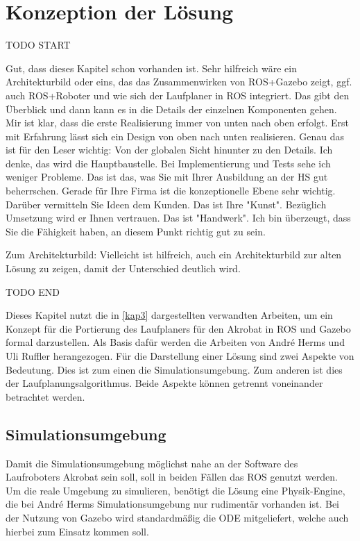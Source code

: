 \chapter{Konzeption der Lösung}
\label{kap4}



TODO START

Gut, dass dieses Kapitel schon vorhanden ist.  Sehr hilfreich wäre ein Architekturbild oder eins, das das Zusammenwirken von ROS+Gazebo zeigt, ggf. auch ROS+Roboter und wie sich der Laufplaner in ROS integriert. 
Das gibt den Überblick und dann kann es in die Details der einzelnen Komponenten gehen.
Mir ist klar, dass die erste Realisierung immer von unten nach oben erfolgt. Erst mit Erfahrung lässt sich ein Design von oben nach unten realisieren. Genau das ist für den Leser wichtig: Von der globalen Sicht hinunter zu den Details.
Ich denke, das wird die Hauptbaustelle. Bei Implementierung und Tests sehe ich weniger Probleme. Das ist das, was Sie mit Ihrer Ausbildung an der HS gut beherrschen. Gerade für Ihre Firma ist die konzeptionelle Ebene sehr wichtig. Darüber vermitteln Sie Ideen dem Kunden. Das ist Ihre "Kunst". Bezüglich Umsetzung wird er Ihnen vertrauen. Das ist "Handwerk".
Ich bin überzeugt, dass Sie die Fähigkeit haben, an diesem Punkt richtig gut zu sein.

Zum Architekturbild:
Vielleicht ist hilfreich, auch ein Architekturbild zur alten Lösung zu zeigen, damit der Unterschied deutlich wird.

TODO END

Dieses Kapitel nutzt die in \autoref{kap3} dargestellten verwandten Arbeiten, um ein Konzept für die Portierung des Laufplaners für den Akrobat in \ac{ROS} und Gazebo formal darzustellen. Als Basis dafür werden die Arbeiten von André Herms \autocite{herms2004} und Uli Ruffler \autocite{ruffler2006} herangezogen. Für die Darstellung einer Lösung sind zwei Aspekte von Bedeutung. Dies ist zum einen die Simulationsumgebung. Zum anderen ist dies der Laufplanungsalgorithmus. Beide Aspekte können getrennt voneinander betrachtet werden.

\section{Simulationsumgebung} 

Damit die Simulationsumgebung möglichst nahe an der Software des Laufroboters Akrobat sein soll, soll in beiden Fällen das \ac{ROS} genutzt werden. Um die reale Umgebung zu simulieren, benötigt die Lösung eine Physik-Engine, die bei André Herms \autocite{herms2004} Simulationsumgebung nur rudimentär vorhanden ist. Bei der Nutzung von Gazebo wird standardmäßig die \acf{ODE} mitgeliefert, welche auch hierbei zum Einsatz kommen soll.

